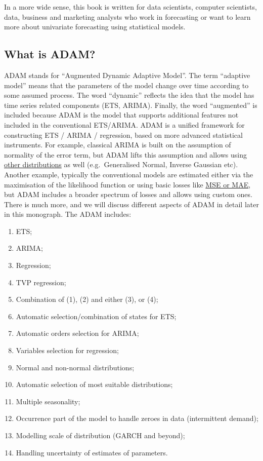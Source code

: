 \documentclass[]{book}
\providecommand{\tightlist}{%
  \setlength{\itemsep}{0pt}\setlength{\parskip}{0pt}}
\theoremstyle{definition}
\theoremstyle{definition}
\theoremstyle{definition}
\theoremstyle{definition}
\theoremstyle{remark}
\begin{document}
In a more wide sense, this book is written for data scientists, computer scientists, data, business and marketing analysts who work in forecasting or want to learn more about univariate forecasting using statistical models.

\hypertarget{what-is-adam}{%
\subsection*{What is ADAM?}\label{what-is-adam}}

ADAM stands for ``Augmented Dynamic Adaptive Model''. The term ``adaptive model'' means that the parameters of the model change over time according to some assumed process. The word ``dynamic'' reflects the idea that the model has time series related components (ETS, ARIMA). Finally, the word ``augmented'' is included because ADAM is the model that supports additional features not included in the conventional ETS/ARIMA. ADAM is a unified framework for constructing ETS / ARIMA / regression, based on more advanced statistical instruments. For example, classical ARIMA is built on the assumption of normality of the error term, but ADAM lifts this assumption and allows using \protect\hyperlink{distributions}{other distributions} as well (e.g.~Generalised Normal, Inverse Gaussian etc). Another example, typically the conventional models are estimated either via the maximisation of the likelihood function or using basic losses like \protect\hyperlink{errorMeasures}{MSE or MAE}, but ADAM includes a broader spectrum of losses and allows using custom ones. There is much more, and we will discuss different aspects of ADAM in detail later in this monograph. The ADAM includes:

\begin{enumerate}
\def\labelenumi{\arabic{enumi}.}
\tightlist
\item
  ETS;
\item
  ARIMA;
\item
  Regression;
\item
  TVP regression;
\item
  Combination of (1), (2) and either (3), or (4);
\item
  Automatic selection/combination of states for ETS;
\item
  Automatic orders selection for ARIMA;
\item
  Variables selection for regression;
\item
  Normal and non-normal distributions;
\item
  Automatic selection of most suitable distributions;
\item
  Multiple seasonality;
\item
  Occurrence part of the model to handle zeroes in data (intermittent demand);
\item
  Modelling scale of distribution (GARCH and beyond);
\item
  Handling uncertainty of estimates of parameters.
\end{enumerate}
\end{document}
